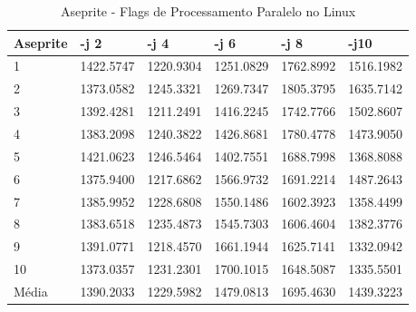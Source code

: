 \begin{table}[!ht]
\centering
\tiny
\caption{Aseprite - Flags de Processamento Paralelo no Linux}
\label{tab:flag_processamento_paralelo:linux:aseprite}
\begin{tabular}{llllll}
\textbf{Aseprite} & \textbf{-j 2} & \textbf{-j 4} & \textbf{-j 6} & \textbf{-j 8} & \textbf{-j10}  \\ \toprule
1                 &  1422.5747    &     1220.9304 &     1251.0829 &     1762.8992 &  1516.1982    \\ 
2                 &  1373.0582    &     1245.3321 &     1269.7347 &     1805.3795 &  1635.7142    \\ 
3                 &  1392.4281    &     1211.2491 &     1416.2245 &     1742.7766 &  1502.8607    \\ 
4                 &  1383.2098    &     1240.3822 &     1426.8681 &     1780.4778 &  1473.9050    \\ 
5                 &  1421.0623    &     1246.5464 &     1402.7551 &     1688.7998 &  1368.8088    \\ 
6                 &  1375.9400    &     1217.6862 &     1566.9732 &     1691.2214 &  1487.2643    \\ 
7                 &  1385.9952    &     1228.6808 &     1550.1486 &     1602.3923 &  1358.4499    \\ 
8                 &  1383.6518    &     1235.4873 &     1545.7303 &     1606.4604 &  1382.3776    \\ 
9                 &  1391.0771    &     1218.4570 &     1661.1944 &     1625.7141 &  1332.0942    \\ 
10                &  1373.0357    &     1231.2301 &     1700.1015 &     1648.5087 &  1335.5501    \\ \bottomrule
Média             &  1390.2033    &     1229.5982 &     1479.0813 &     1695.4630 &  1439.3223    \\ 
\end{tabular}
\end{table}

